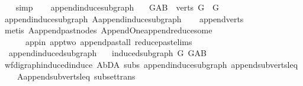 \begin{isabellebody}
\ \ \isamarkupfalse%
\ simp%
\endisatagproof
{\isafoldproof}%
%
\isadelimproof
\ \isanewline
%
\endisadelimproof
\isanewline
{}\isamarkupfalse%
\ \ append{\isacharunderscore}{\kern0pt}induce{\isacharunderscore}{\kern0pt}subgraph{}{\isacharcolon}{\kern0pt}\ \isanewline
\ \ {\isachardoublequoteopen}G{\isacharunderscore}{\kern0pt}AB\ {\isasymrestriction}\ {\isacharparenleft}{\kern0pt}verts\ G{\isacharparenright}{\kern0pt}\ {\isacharequal}{\kern0pt}\ G{\isachardoublequoteclose}\isanewline
%
\isadelimproof
\ \ %
\endisadelimproof
%
\isatagproof
{}\isamarkupfalse%
\ append{\isacharunderscore}{\kern0pt}induce{\isacharunderscore}{\kern0pt}subgraph\ A{}{\isachardot}{\kern0pt}append{\isacharunderscore}{\kern0pt}induce{\isacharunderscore}{\kern0pt}subgraph\isanewline
\ \ \isamarkupfalse%
\ append{\isacharunderscore}{\kern0pt}verts\isanewline
\ \ \isamarkupfalse%
\ {\isacharparenleft}{\kern0pt}metis\ A{}{\isachardot}{\kern0pt}append{\isacharunderscore}{\kern0pt}past{\isacharunderscore}{\kern0pt}nodes\ Append{\isacharunderscore}{\kern0pt}One{\isachardot}{\kern0pt}append{\isacharunderscore}{\kern0pt}reduce{\isacharunderscore}{\kern0pt}some\ \isanewline
\ \ \ \ \ \ app{\isacharunderscore}{\kern0pt}in\ app{\isacharunderscore}{\kern0pt}two\ append{\isacharunderscore}{\kern0pt}past{\isacharunderscore}{\kern0pt}all\ reduce{\isacharunderscore}{\kern0pt}past{\isachardot}{\kern0pt}elims{\isacharparenright}{\kern0pt}%
\endisatagproof
{\isafoldproof}%
%
\isadelimproof
\ \isanewline
%
\endisadelimproof
\isanewline
{}\isamarkupfalse%
\ \ append{\isacharunderscore}{\kern0pt}induced{\isacharunderscore}{\kern0pt}subgraph{}{\isacharcolon}{\kern0pt}\ \isanewline
\ \ {\isachardoublequoteopen}induced{\isacharunderscore}{\kern0pt}subgraph\ G\ G{\isacharunderscore}{\kern0pt}AB{\isachardoublequoteclose}\isanewline
%
\isadelimproof
\ \ %
\endisadelimproof
%
\isatagproof
{}\isamarkupfalse%
\ wf{\isacharunderscore}{\kern0pt}digraph{\isachardot}{\kern0pt}induced{\isacharunderscore}{\kern0pt}induce\ A{}{\isachardot}{\kern0pt}bD{\isacharunderscore}{\kern0pt}A\ subs{\isacharparenleft}{\kern0pt}{}{\isacharparenright}{\kern0pt}\ append{\isacharunderscore}{\kern0pt}induce{\isacharunderscore}{\kern0pt}subgraph{}\ append{\isacharunderscore}{\kern0pt}subverts{\isacharunderscore}{\kern0pt}leq\isanewline
\ \ \ \ A{}{\isachardot}{\kern0pt}append{\isacharunderscore}{\kern0pt}subverts{\isacharunderscore}{\kern0pt}leq\ subset{\isacharunderscore}{\kern0pt}trans\isanewline

\end{isabellebody}
